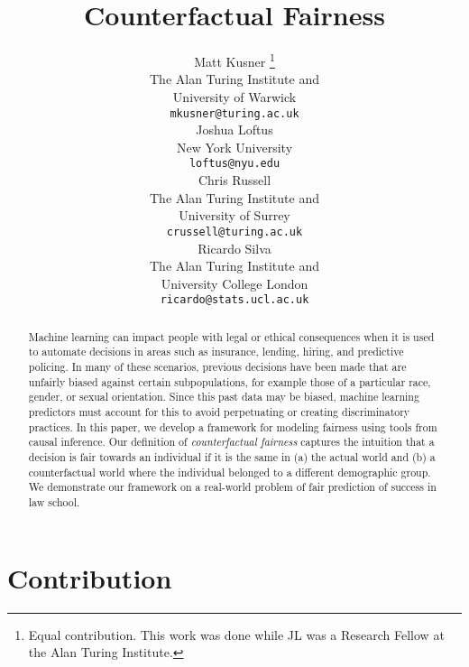 \documentclass{article}
\title{Counterfactual Fairness}
\author{
  Matt Kusner \thanks{Equal contribution. This work was done while JL was a Research Fellow at the Alan Turing Institute.}\\
  The Alan Turing Institute and \\
  University of Warwick \\
  \texttt{mkusner@turing.ac.uk} \\
  \And
  Joshua Loftus \samethanks\\
  New York University \\
  \texttt{loftus@nyu.edu} \\
  \And
  Chris Russell \samethanks \\
  The Alan Turing Institute and \\
  University of Surrey\\
  \texttt{crussell@turing.ac.uk} \\
  \And
  Ricardo Silva \\
  The Alan Turing Institute and \\
  University College London\\
  \texttt{ricardo@stats.ucl.ac.uk} \\
}
\begin{document}
\maketitle




\begin{abstract} 
  Machine learning can impact people with legal or ethical
  consequences when it is used
  to automate decisions in areas such as insurance, lending, hiring,
  and predictive policing.  In many of these scenarios,
  previous decisions have been made that are unfairly biased against
  certain subpopulations, for example those of a particular race, gender, or
  sexual orientation.  Since this past data may be biased,
  machine learning predictors must account for this to avoid
  perpetuating or creating discriminatory practices.
  In this paper, we develop a framework for modeling fairness
  using tools from causal inference. Our definition of
  \emph{counterfactual fairness} captures the
  intuition that a decision is fair towards an individual if it is
  the same in (a) the actual world and (b) a counterfactual world
  where the individual belonged to a different demographic
  group. We demonstrate our framework on a real-world problem of fair
  prediction of success in law school.
\end{abstract} 

\section{Contribution}
\label{sec:introduction}

\end{document}
